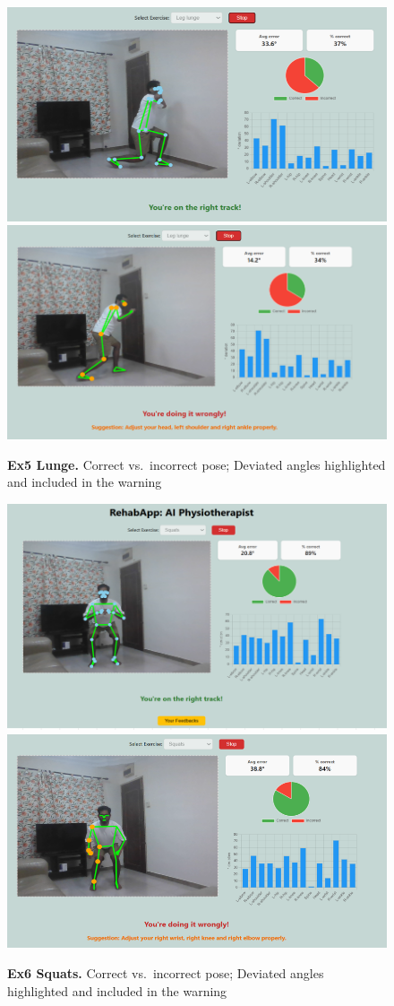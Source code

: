 \documentclass{article}
\begin{document}
\begin{figure}[H]
  \centering
  \includegraphics[width=.48\linewidth]{figs/ex5_correct.png}%
  \hfill
  \includegraphics[width=.48\linewidth]{figs/ex5_bad_form.png}
  \caption{\textbf{Ex5 Lunge.}
           Correct vs.\ incorrect pose; Deviated angles highlighted and included in the warning}
  \label{fig:qual_ex5}
\end{figure}

\begin{figure}[H]
  \centering
  \includegraphics[width=.48\linewidth]{figs/ex6_correct.png}%
  \hfill
  \includegraphics[width=.48\linewidth]{figs/ex6_bad_form.png}
  \caption{\textbf{Ex6 Squats.}
           Correct vs.\ incorrect pose; Deviated angles highlighted and included in the warning}
  \label{fig:qual_ex6}
\end{figure}
\end{document}
